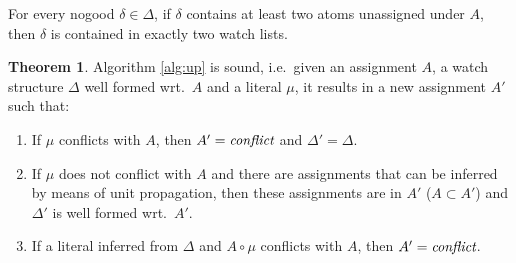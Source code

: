 \documentclass{vutinfth} %
\theoremstyle{example}
\theoremstyle{definition}
\theoremstyle{theorem}
\newtheorem{theorem}{Theorem}[section]
\theoremstyle{lemma}
\theoremstyle{corollary}
\newcommand{\ass}{A}
\newcommand{\welf}{well formed\xspace}
\newcommand{\sgl}{\mu}
\begin{document}



For every nogood $\delta \in \Delta$, if $\delta$ contains at least two atoms unassigned under $\ass$, then $\delta$ is contained in exactly two watch lists.

\begin{theorem}
Algorithm \ref{alg:up} is sound, i.e.~given an assignment $\ass$, a watch structure $\Delta$ \welf wrt.~$\ass$ and a literal $\sgl$, it results in a new assignment $\ass'$ such that:
\begin{enumerate}
\item If $\sgl$ conflicts with $\ass$, then $\ass' = \emph{conflict}$ and $\Delta' = \Delta$. %

\item If $\sgl$ does not conflict with $\ass$ and there are assignments that can be inferred by means of unit propagation, then these assignments are in $\ass'$ ($\ass \subset \ass'$) and $\Delta'$ is \welf wrt.~$\ass'$.

\item If a literal inferred from $\Delta$ and $\ass \circ \sgl$ conflicts with $\ass$, then $\ass' = \emph{conflict}$.
\end{enumerate}
\end{theorem}
\end{document}
